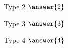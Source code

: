 \documentclass{ximera}
\begin{document}
\begin{exercise}
  Type $2$ $\answer{2}$
  \begin{exercise}
    Type $3$ $\answer{3}$
  \end{exercise}
  Type $4$ $\answer{4}$
\end{exercise}
\end{document}
